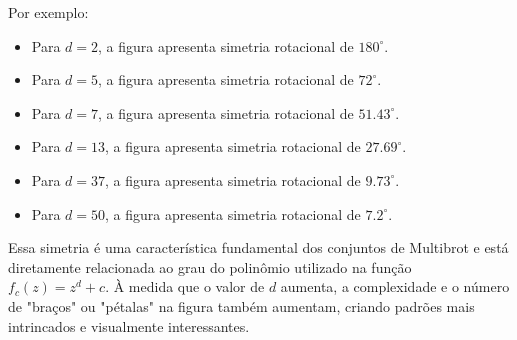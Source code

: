 \begin{enumerate}
        Por exemplo:
        \begin{itemize}
                \item Para $d = 2$, a figura apresenta simetria rotacional de $180^\circ$.
                \item Para $d = 5$, a figura apresenta simetria rotacional de $72^\circ$.
                \item Para $d = 7$, a figura apresenta simetria rotacional de $51.43^\circ$.
                \item Para $d = 13$, a figura apresenta simetria rotacional de $27.69^\circ$.
                \item Para $d = 37$, a figura apresenta simetria rotacional de $9.73^\circ$.
                \item Para $d = 50$, a figura apresenta simetria rotacional de $7.2^\circ$.
        \end{itemize}

        Essa simetria é uma característica fundamental dos conjuntos de Multibrot e está diretamente relacionada ao grau do polinômio utilizado na função $f_c(z) = z^d + c$. À medida que o valor de $d$ aumenta, a complexidade e o número de "braços" ou "pétalas" na figura também aumentam, criando padrões mais intrincados e visualmente interessantes.

\end{enumerate}
